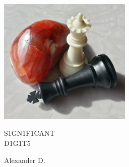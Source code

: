 \thispagestyle{empty}
\begin{center}

\includegraphics[width=2.5in]{titlepic.png}

\vfill

\titlefont\HUGE
S1GN1F1CANT\\
\fontsize{48}{48}\selectfont D1G1T5

\vfill

\huge
Alexander D.


\end{center}
\clearpage